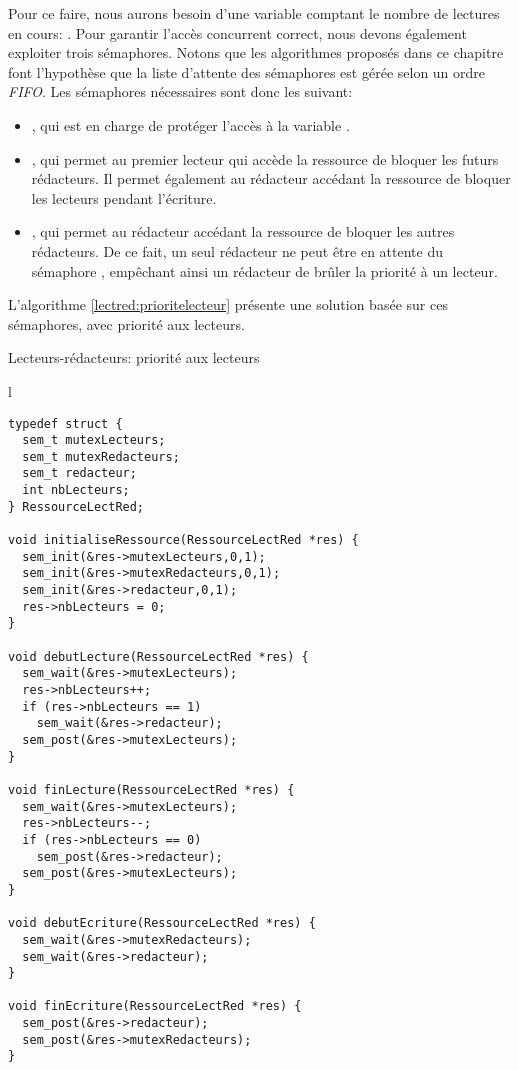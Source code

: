Pour ce faire, nous aurons besoin d'une variable comptant le nombre de lectures en cours: . Pour garantir l'accès concurrent correct, nous devons également exploiter trois sémaphores. Notons que les algorithmes proposés dans ce chapitre font l'hypothèse que la liste d'attente des sémaphores est gérée selon un ordre \textit{FIFO}. Les sémaphores nécessaires sont donc les suivant:

\begin{itemize}
\item {}, qui est en charge de protéger l'accès à la variable .
\item {}, qui permet au premier lecteur qui accède la ressource de bloquer les futurs rédacteurs. Il permet également au rédacteur accédant la ressource de bloquer les lecteurs pendant l'écriture.
\item {}, qui permet au rédacteur accédant la ressource de bloquer les autres rédacteurs. De ce fait, un seul rédacteur ne peut être en attente du sémaphore , empêchant ainsi un rédacteur de brûler la priorité à un lecteur.
\end{itemize}

L'algorithme \ref{lectred:prioritelecteur} présente une solution basée sur ces sémaphores, avec priorité aux lecteurs.


\begin{algorithm}[h!tp]
\caption{Lecteurs-rédacteurs: priorité aux lecteurs}\label{lectred:prioritelecteur}
\begin{center}
\begin{tabular}{l}
\lstset{language=C++}
\begin{lstlisting}
typedef struct {
  sem_t mutexLecteurs;
  sem_t mutexRedacteurs;
  sem_t redacteur;
  int nbLecteurs;
} RessourceLectRed;

void initialiseRessource(RessourceLectRed *res) {
  sem_init(&res->mutexLecteurs,0,1);
  sem_init(&res->mutexRedacteurs,0,1);
  sem_init(&res->redacteur,0,1);
  res->nbLecteurs = 0;
}

void debutLecture(RessourceLectRed *res) {
  sem_wait(&res->mutexLecteurs);
  res->nbLecteurs++;
  if (res->nbLecteurs == 1)
    sem_wait(&res->redacteur);
  sem_post(&res->mutexLecteurs);
}

void finLecture(RessourceLectRed *res) {
  sem_wait(&res->mutexLecteurs);
  res->nbLecteurs--;
  if (res->nbLecteurs == 0)
    sem_post(&res->redacteur);
  sem_post(&res->mutexLecteurs);
}

void debutEcriture(RessourceLectRed *res) {
  sem_wait(&res->mutexRedacteurs);
  sem_wait(&res->redacteur);
}

void finEcriture(RessourceLectRed *res) {
  sem_post(&res->redacteur);
  sem_post(&res->mutexRedacteurs);
}
\end{lstlisting}
\end{tabular}
\end{center}
\end{algorithm}


